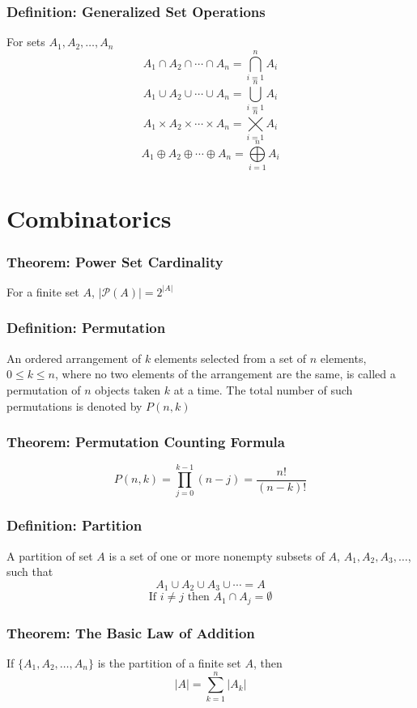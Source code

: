 \documentclass{article}
\begin{document}
\subsubsection*{Definition: Generalized Set Operations}
For sets $A_1 , A_2 , \dots , A_n$
$$A_1 \cap A_2 \cap \cdots \cap A_n = \bigcap \limits_{i = 1}^{n} A_i$$
$$A_1 \cup A_2 \cup \cdots \cup A_n = \bigcup \limits_{i = 1}^{n} A_i$$
$$A_1 \times A_2 \times \cdots \times A_n = \bigtimes \limits_{i = 1}^{n} A_i$$
$$A_1 \oplus A_2 \oplus \cdots \oplus A_n = \bigoplus \limits_{i = 1}^{n} A_i$$

\section{Combinatorics} 
\subsubsection*{Theorem: Power Set Cardinality}
For a finite set $A$, $| \mathcal{P} (A) | = 2^{|A|}$

\subsubsection*{Definition: Permutation}
An ordered arrangement of $k$ elements selected from a set of $n$ elements, $0\leq k \leq n$, where no two elements of the arrangement are the same, is called a permutation of $n$ objects taken $k$ at a time. The total number of such permutations is denoted by $P(n,k)$

\subsubsection*{Theorem: Permutation Counting Formula}
$$P(n,k) = \prod_{j = 0} ^{k-1} (n-j) = \frac{n!}{(n-k)!}$$

\subsubsection*{Definition: Partition}
A partition of set $A$ is a set of one or more nonempty subsets of $A$, $A_1 , A_2 , A_3, \dots$, such that
$$A_1 \cup A_2 \cup A_3 \cup \cdots = A$$
$$\text{If } i \neq j \text{ then } A_1 \cap A_j = \emptyset$$

\subsubsection*{Theorem: The Basic Law of Addition}
If $\{ A_1 , A_2, \dots , A_n \}$ is the partition of a finite set $A$, then
$$|A| = \sum^n_{k=1} |A_k|$$
\end{document}
